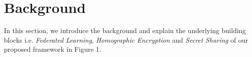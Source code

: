 \documentclass[conference]{IEEEtran}
\begin{document}
\section{Background}
In this section, we introduce the background and explain the underlying building blocks i.e. {\itshape Federated Learning}, {\itshape Homographic Encryption} and {\itshape Secret Sharing} of our proposed framework in Figure 1.
\end{document}
